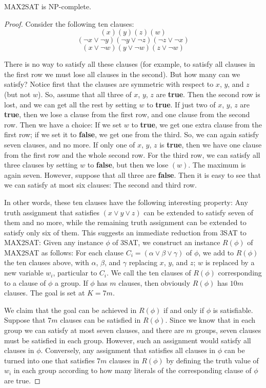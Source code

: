 \documentclass[12pt]{article}
\begin{document}
\begin{defbox}[Theorem]
  MAX2SAT is NP-complete.
\end{defbox}
\begin{proof}
  Consider the following ten clauses:
\[
(x)(y)(z)(w)
\]
\[
(\neg x \vee \neg y)(\neg y \vee \neg z)(\neg z \vee \neg x)
\]
\[
(x \vee \neg w)(y \vee \neg w)(z \vee \neg w)
\]

There is no way to satisfy all these clauses (for example, to satisfy all clauses in the first row we must lose all clauses in the second). But how many can we satisfy? Notice first that the clauses are symmetric with respect to $x$, $y$, and $z$ (but not $w$). So, assume that all three of $x$, $y$, $z$ are \textbf{true}. Then the second row is lost, and we can get all the rest by setting $w$ to \textbf{true}. If just two of $x$, $y$, $z$ are \textbf{true}, then we lose a clause from the first row, and one clause from the second row. Then we have a choice: If we set $w$ to \textbf{true}, we get one extra clause from the first row; if we set it to \textbf{false}, we get one from the third. So, we can again satisfy seven clauses, and no more. If only one of $x$, $y$, $z$ is \textbf{true}, then we have one clause from the first row and the whole second row. For the third row, we can satisfy all three clauses by setting $w$ to \textbf{false}, but then we lose $(w)$. The maximum is again seven. However, suppose that all three are \textbf{false}. Then it is easy to see that we can satisfy at most six clauses: The second and third row.

In other words, these ten clauses have the following interesting property: Any truth assignment that satisfies $(x \vee y \vee z)$ can be extended to satisfy seven of them and no more, while the remaining truth assignment can be extended to satisfy only six of them. This suggests an immediate reduction from \textsc{3SAT} to \textsc{MAX2SAT}: Given any instance $\phi$ of \textsc{3SAT}, we construct an instance $R(\phi)$ of \textsc{MAX2SAT} as follows: For each clause $C_i = (\alpha \vee \beta \vee \gamma)$ of $\phi$, we add to $R(\phi)$ the ten clauses above, with $\alpha$, $\beta$, and $\gamma$ replacing $x$, $y$, and $z$; $w$ is replaced by a new variable $w_i$, particular to $C_i$. We call the ten clauses of $R(\phi)$ corresponding to a clause of $\phi$ a group. If $\phi$ has $m$ clauses, then obviously $R(\phi)$ has $10m$ clauses. The goal is set at $K = 7m$.

We claim that the goal can be achieved in $R(\phi)$ if and only if $\phi$ is satisfiable. Suppose that $7m$ clauses can be satisfied in $R(\phi)$. Since we know that in each group we can satisfy at most seven clauses, and there are $m$ groups, seven clauses must be satisfied in each group. However, such an assignment would satisfy all clauses in $\phi$. Conversely, any assignment that satisfies all clauses in $\phi$ can be turned into one that satisfies $7m$ clauses in $R(\phi)$ by defining the truth value of $w_i$ in each group according to how many literals of the corresponding clause of $\phi$ are true.


\end{proof}
\end{document}

